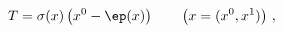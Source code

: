 \begin{equation}
 T=\sigma(x) \left(x^0 -\ep(x)\right)\qquad
	 \left(x = (x^0,x^1)\right)\,,\label{TP}
\end{equation}

